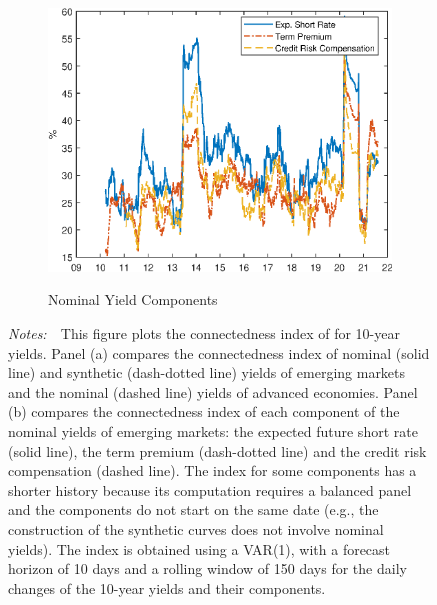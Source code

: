 \documentclass[a4paper, 12pt]{article}
\newcommand{\figtext}[1]{
	\vspace{-1ex}
	\captionsetup{justification=justified,font=footnotesize}
	\caption*{#1}
}
\newcommand{\fignotes}[1]{\figtext{\emph{Notes:~}~#1}}
\begin{document}
\begin{appendices}
\begin{figure}[tbph]
\begin{center}
\begin{minipage}{0.9\linewidth}
\begin{center}
					\begin{subfigure}[t]{\linewidth}
						\includegraphics[trim={0cm 0cm 0cm 0cm},clip,height=0.33\textheight,width=\linewidth]{../Figures/dy_index10y_dcmp.eps} \\
						\vspace{-0.35cm}
						\caption{Nominal Yield Components} \label{subfig:dyindex10ydcmp}
					\end{subfigure}
				\end{center}
				\fignotes{This figure plots the connectedness index of \cite{DieboldYilmaz:2014} for 10-year yields. 
					Panel (a) compares the connectedness index of nominal (solid line) and synthetic (dash-dotted line) yields of emerging markets and the nominal (dashed line) yields of advanced economies. Panel (b) compares the connectedness index of each component of the nominal yields of emerging markets: the expected future short rate (solid line), the term premium (dash-dotted line) and the credit risk compensation (dashed line). The index for some components has a shorter history because its computation requires a balanced panel and the components do not start on the same date (e.g., the construction of the synthetic curves does not involve nominal yields). The index is obtained using a VAR(1), with a forecast horizon of 10 days and a rolling window of 150 days for the daily changes of the 10-year yields and their components.}
			\end{minipage}
		\end{center}
	\end{figure}
	
	\newpage
	

\end{appendices}
\end{document}
